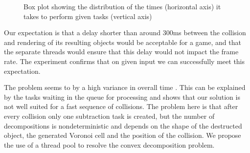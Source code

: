 \begin{figure}
\centering
\caption{Box plot showing the distribution of the times (horizontal axis) it takes to perform given tasks (vertical axis)}
\label{fig:boxtimes}
\end{figure}


Our expectation is that a delay shorter than around 300ms between the collision
and rendering of its resulting objects would be acceptable for a game, and that
the separate threads would ensure that this delay would not impact the frame
rate. The experiment confirms that on given input we can successfully meet this
expectation.

The problem seems to by a high variance in overall time . This can be explained by the tasks waiting in the queue for processing and shows that our solution is not well suited for a fast sequence of collisions. The problem here is that after every collision only one subtraction task is created, but the number of decompositions is nondeterministic and depends on the shape of the destructed object, the generated Voronoi cell and the position of the collision. We propose the use of a thread pool to resolve the convex decomposition problem.

